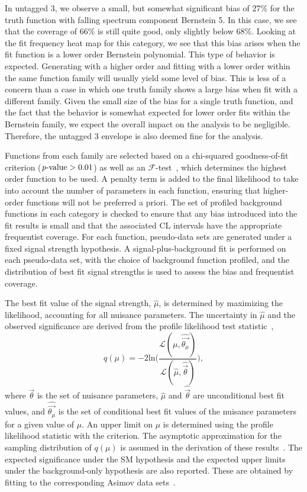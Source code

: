 In untagged 3, we observe a small, but somewhat significant bias of 27\% for the truth function with falling spectrum
component Bernstein 5. In this case, we see that the coverage of 66\% is still quite good, only slightly below 68\%. 
Looking at the fit frequency heat map for this category, we see that this bias arises when the fit function is a 
lower order Bernstein polynomial. This type of behavior is expected. Generating with a higher order and fitting with a lower 
order within the same function family will usually yield some level of bias. This is less of a concern than a case in which one 
truth family shows a large bias when fit with a different family. Given the small size of the bias for a single truth 
function, and the fact that the behavior is somewhat expected for lower order fits within the Bernstein family, we expect 
the overall impact on the analysis to be negligible. Therefore, the untagged 3 envelope is also deemed fine for the analysis. 

Functions from each family are selected based on a chi-squared goodness-of-fit criterion ($\text{\textit{p}-value} > 0.01$) as well as an $\mathcal{F}$-test~\cite{Fisher:1922saa}, which determines the highest order function to be used.
A penalty term is added to the final likelihood to take into account the number of parameters in each function, ensuring that higher-order functions will not be preferred a priori.
The set of profiled background functions in each category is checked to ensure that any bias introduced into the fit results is small and that the associated CL intervals have the appropriate frequentist coverage. For each function, pseudo-data sets are generated under a fixed signal strength hypothesis. A signal-plus-background fit is performed on each pseudo-data set, with the choice of background function profiled, and the distribution of best fit signal strengths is used to assess the bias and frequentist coverage.

The best fit value of the signal strength, $\hat{\mu}$, is determined by maximizing the likelihood, accounting for all nuisance parameters.
The uncertainty in $\hat{\mu}$ and the observed significance are derived from the profile likelihood test statistic~\cite{cite:l3},
\begin{equation}
	q(\mu) = -2\mathrm{ln}\Bigg(\frac{\mathcal{L}(\mu, \hat{\vec{\theta_{\mu}}})}{\mathcal{L}(\hat{\mu},\hat{\vec{\theta}})}\Bigg),
\end{equation}
where $\vec{\theta}$ is the set of nuisance parameters, $\hat{\mu}$ and $\hat{\vec{\theta}}$ are unconditional best fit values, and $\hat{\vec{\theta_{\mu}}}$ is the set of conditional best fit values of the nuisance parameters for a given value of $\mu$.
An upper limit on $\mu$ is determined using the profile likelihood statistic with the \CLs criterion.
The asymptotic approximation for the sampling distribution of $q(\mu)$ is assumed in the derivation of these results~\cite{cite:l1,cite:l2,cite:l3,Cowan:2010js}.
The expected significance under the SM hypothesis and the expected upper limits under the background-only hypothesis are also reported.
These are obtained by fitting to the corresponding Asimov data sets~\cite{Cowan:2010js}.

